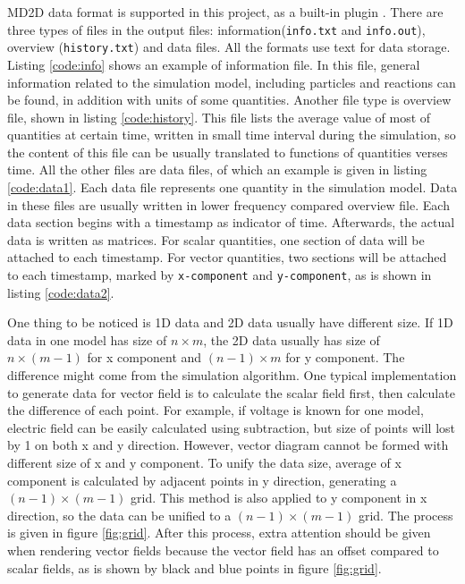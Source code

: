 MD2D data format is supported in this project, as a built-in plugin . There are three types of files in the output files: information(\lstinline{info.txt} and \lstinline{info.out}), overview (\lstinline{history.txt}) and data files. All the formats use text for data storage. Listing \ref{code:info} shows an example of information file. In this file, general information related to the simulation model, including particles and reactions can be found, in addition with units of some quantities. Another file type is overview file, shown in listing \ref{code:history}. This file lists the average value of most of quantities at certain time, written in small time interval during the simulation, so the content of this file can be usually translated to functions of quantities verses time. All the other files are data files, of which an example is given in listing \ref{code:data1}. Each data file represents one quantity in the simulation model. Data in these files are usually written in lower frequency compared overview file. Each data section begins with a timestamp as indicator of time. Afterwards, the actual data is written as matrices. For scalar quantities, one section of data will be attached to each timestamp. For vector quantities, two sections will be attached to each timestamp, marked by \lstinline{x-component} and \lstinline{y-component}, as is shown in listing \ref{code:data2}.

One thing to be noticed is 1D data and 2D data usually have different size. If 1D data in one model has size of $n\times m$, the 2D data usually has size of $n\times(m-1)$ for x component and $(n-1)\times m$ for y component. The difference might come from the simulation algorithm. One typical implementation to generate data for vector field is to calculate the scalar field first, then calculate the difference of each point. For example, if voltage is known for one model, electric field can be easily calculated using subtraction, but size of points will lost by 1 on both x and y direction. However, vector diagram cannot be formed with different size of x and y component. To unify the data size, average of x component is calculated by adjacent points in y direction, generating a $(n-1)\times (m-1)$ grid. This method is also applied to y component in x direction, so the data can be unified to a $(n-1)\times (m-1)$ grid. The process is given in figure \ref{fig:grid}. After this process, extra attention should be given when rendering vector fields because the vector field has an offset compared to scalar fields, as is shown by black and blue points in figure \ref{fig:grid}.

